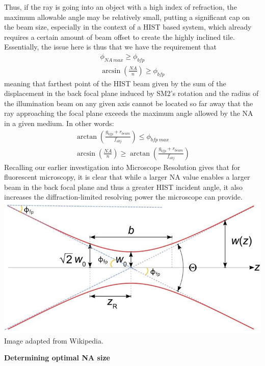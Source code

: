 Thus, if the ray is going into an object with a high index of refraction, the maximum allowable angle may be relatively small, putting a significant cap on the beam size, especially in the context of a HIST based system, which already requires a certain amount of beam offset to create the highly inclined tile.
Essentially, the issue here is thus that we have the requirement that
\begin{gather}
    \phi_{NA \ max} \geq \phi_{bfp}\\
    \arcsin(\frac{NA}{n}) \geq \phi_{bfp}
\end{gather}
meaning that farthest point of the HIST beam given by the sum of the displacement in the back focal plane induced by SM2's rotation and the radius of the illumination beam on any given axis cannot be located so far away that the ray approaching the focal plane exceeds the maximum angle allowed by the NA in a given medium. In other words:
\begin{gather}
    \arctan(\frac{g_{bfp} + r_{beam}}{f_{obj}}) \leq \phi_{bfp \ max}\\
    \arcsin(\frac{NA}{n}) \geq \arctan(\frac{g_{bfp} + r_{beam}}{f_{obj}})
\end{gather}
Recalling our earlier investigation into Microscope Resolution gives that for fluorescent microscopy, it is clear that while a larger NA value enables a larger beam in the back focal plane and thus a greater HIST incident angle, it also increases the diffraction-limited resolving power the microscope can provide.\\
\includegraphics[width=\textwidth]{Hestia_HIST_Computation_Fig3.jpg}\\
Image adapted from Wikipedia.
\newpage
\begin{center}
    \textbf{Determining optimal NA size}
\end{center}
